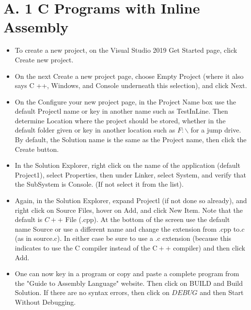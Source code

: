 \documentclass[10pt]{article}
\begin{document}
\section*{A. 1 C Programs with Inline Assembly}
\begin{itemize}
  \item To create a new project, on the Visual Studio 2019 Get Started page, click Create new project.
  \item On the next Create a new project page, choose Empty Project (where it also says C ++, Windows, and Console underneath this selection), and click Next.
  \item On the Configure your new project page, in the Project Name box use the default Projectl name or key in another name such as TestInLine. Then determine Location where the project should be stored, whether in the default folder given or key in another location such as $F: \backslash$ for a jump drive. By default, the Solution name is the same as the Project name, then click the Create button.
  \item In the Solution Explorer, right click on the name of the application (default Project1), select Properties, then under Linker, select System, and verify that the SubSystem is Console. (If not select it from the list).
  \item Again, in the Solution Explorer, expand Projectl (if not done so already), and right click on Source Files, hover on Add, and click New Item. Note that the default is $C++$ File (.cpp). At the bottom of the screen use the default name Source or use a different name and change the extension from .cpp to.$c$ (as in source.c). In either case be sure to use a .c extension (because this indicates to use the C compiler instead of the $\mathrm{C}++$ compiler) and then click Add.
  \item One can now key in a program or copy and paste a complete program from the "Guide to Assembly Language" website. Then click on BUILD and Build Solution. If there are no syntax errors, then click on $D E B U G$ and then Start Without Debugging.
\end{itemize}
\end{document}
